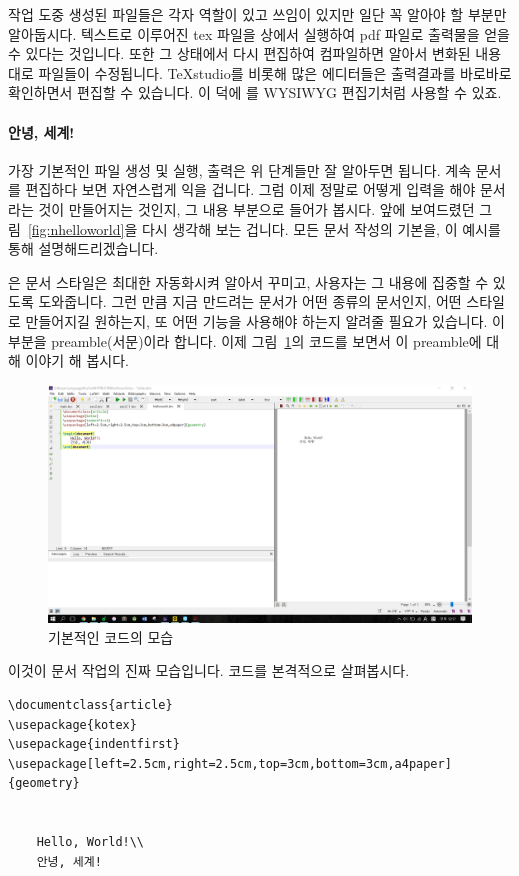 작업 도중 생성된 파일들은 각자 역할이 있고 쓰임이 있지만 일단 꼭 알아야 할 부분만 알아둡시다. 텍스트로 이루어진 tex 파일을 \lt 상에서 실행하여 pdf 파일로 출력물을 얻을 수 있다는 것입니다. 또한 그 상태에서 다시 편집하여 컴파일하면 알아서 변화된 내용대로 파일들이 수정됩니다. TeXstudio를 비롯해 많은 에디터들은 출력결과를 바로바로 확인하면서 편집할 수 있습니다. 이 덕에 \lt 를 WYSIWYG 편집기처럼 사용할 수 있죠.

\paragraph{안녕, 세계!}
가장 기본적인 파일 생성 및 실행, 출력은 위 단계들만 잘 알아두면 됩니다. 계속 문서를 편집하다 보면 자연스럽게 익을 겁니다. 그럼 이제 정말로 어떻게 입력을 해야 문서라는 것이 만들어지는 것인지, 그 내용 부분으로 들어가 봅시다. 앞에 보여드렸던 그림~\ref{fig:nhelloworld}을 다시 생각해 보는 겁니다. 모든 \lt 문서 작성의 기본을, 이 예시를 통해 설명해드리겠습니다.

\lt 은 문서 스타일은 최대한 자동화시켜 알아서 꾸미고, 사용자는 그 내용에 집중할 수 있도록 도와줍니다. 그런 만큼 지금 만드려는 문서가 어떤 종류의 문서인지, 어떤 스타일로 만들어지길 원하는지, 또 어떤 기능을 사용해야 하는지 알려줄 필요가 있습니다. 이 부분을 preamble(서문)이라 합니다. 이제 그림~\ref{fig:helloworld}의 코드를 보면서 이 preamble에 대해 이야기 해 봅시다.

\begin{figure}[h]
	\includegraphics[width=\textwidth]{figures/helloworld.png}
	\caption{기본적인 코드의 모습\label{fig:helloworld}}
\end{figure}

이것이 \lt 문서 작업의 진짜 모습입니다. 코드를 본격적으로 살펴봅시다.

\begin{Verbatim}[frame=single]
\documentclass{article}
\usepackage{kotex}
\usepackage{indentfirst}
\usepackage[left=2.5cm,right=2.5cm,top=3cm,bottom=3cm,a4paper]{geometry}
	

	Hello, World!\\
	안녕, 세계!

\end{Verbatim}

